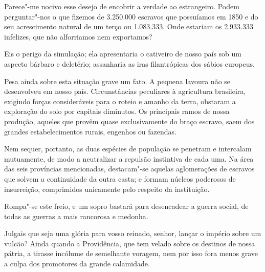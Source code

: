 \begin{linenumbers}
Parece"-me nocivo esse desejo de encobrir a verdade ao estrangeiro.
Podem perguntar"-nos o que fizemos de 3.250.000 escravos que
possuíamos em 1850 e do seu acrescimento natural de um terço ou
1.083.333. Onde estariam os 2.933.333 infelizes, que não alforriamos nem exportamos?

Eis o perigo da simulação; ela apresentaria o cativeiro de nosso país
sob um aspecto bárbaro e deletério; assanharia as iras filantrópicas
dos sábios europeus.

Pesa ainda sobre esta situação grave um fato. A pequena lavoura não se
desenvolveu em nosso país. Circunstâncias peculiares à agricultura
brasileira, exigindo forças consideráveis para o roteio e amanho da
terra, obstaram a exploração do solo por capitais diminutos. Os
principais ramos de nossa produção, aqueles que provêm quase
exclusivamente do braço escravo, saem dos grandes estabelecimentos
rurais, engenhos ou fazendas. 

Nem sequer, portanto, as duas espécies de população se penetram e
intercalam mutuamente, de modo a neutralizar a repulsão instintiva de
cada uma. Na área das seis províncias mencionadas, destacam"-se
aquelas aglomerações de escravos que solvem a continuidade da outra
casta; e formam núcleos poderosos de insurreição, comprimidos
unicamente pelo respeito da instituição.

Rompa"-se este freio, e um sopro bastará para desencadear a guerra
social, de todas as guerras a mais rancorosa e medonha.

Julgais que seja uma glória para vosso reinado, senhor, lançar o império
sobre um vulcão? Ainda quando a Providência, que tem velado sobre os
destinos de nossa pátria, a tirasse incólume de semelhante voragem, nem
por isso fora menos grave a culpa dos promotores da grande calamidade. 

\end{linenumbers}

\sectionitem

